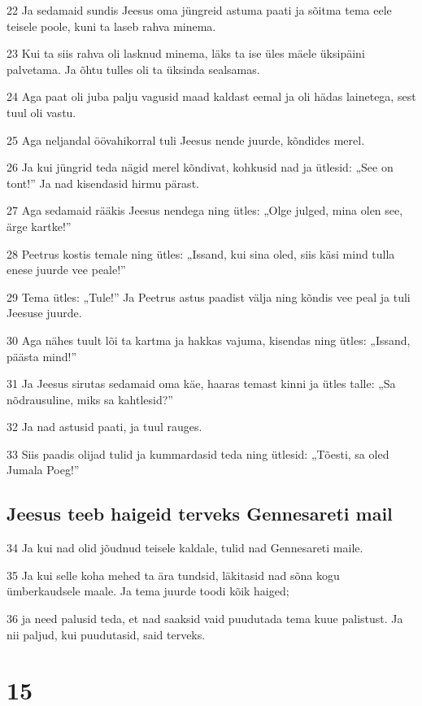\par 22 Ja sedamaid sundis Jeesus oma jüngreid astuma paati ja sõitma tema eele teisele poole, kuni ta laseb rahva minema.
\par 23 Kui ta siis rahva oli lasknud minema, läks ta ise üles mäele üksipäini palvetama. Ja õhtu tulles oli ta üksinda sealsamas.
\par 24 Aga paat oli juba palju vagusid maad kaldast eemal ja oli hädas lainetega, sest tuul oli vastu.
\par 25 Aga neljandal öövahikorral tuli Jeesus nende juurde, kõndides merel.
\par 26 Ja kui jüngrid teda nägid merel kõndivat, kohkusid nad ja ütlesid: „See on tont!” Ja nad kisendasid hirmu pärast.
\par 27 Aga sedamaid rääkis Jeesus nendega ning ütles: „Olge julged, mina olen see, ärge kartke!”
\par 28 Peetrus kostis temale ning ütles: „Issand, kui sina oled, siis käsi mind tulla enese juurde vee peale!”
\par 29 Tema ütles: „Tule!” Ja Peetrus astus paadist välja ning kõndis vee peal ja tuli Jeesuse juurde.
\par 30 Aga nähes tuult lõi ta kartma ja hakkas vajuma, kisendas ning ütles: „Issand, päästa mind!”
\par 31 Ja Jeesus sirutas sedamaid oma käe, haaras temast kinni ja ütles talle: „Sa nõdrausuline, miks sa kahtlesid?”
\par 32 Ja nad astusid paati, ja tuul rauges.
\par 33 Siis paadis olijad tulid ja kummardasid teda ning ütlesid: „Tõesti, sa oled Jumala Poeg!”

\section*{Jeesus teeb haigeid terveks Gennesareti mail}

\par 34 Ja kui nad olid jõudnud teisele kaldale, tulid nad Gennesareti maile.
\par 35 Ja kui selle koha mehed ta ära tundsid, läkitasid nad sõna kogu ümberkaudsele maale. Ja tema juurde toodi kõik haiged;
\par 36 ja need palusid teda, et nad saaksid vaid puudutada tema kuue palistust. Ja nii paljud, kui puudutasid, said terveks.


\chapter{15}

